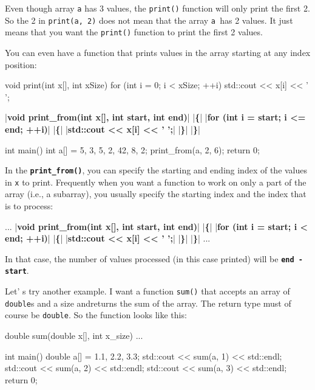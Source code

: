 Even though array \texttt{a} has 3 values, the \texttt{print()} function will only print the first 2. So the 2 in \texttt{print(a, 2)} does not mean that the array \texttt{a }has 2 values. It just means that you want the \texttt{print()} function to print the first 2 values.

You can even have a function that prints values in the array starting at any index position:

\begin{consolethree}[escapeinside=||]
void print(int x[], int xSize)
{
    for (int i = 0; i < xSize; ++i)
    {
        std::cout << x[i] << ' ';
    }
}

|\textbf{void print\_from(int x[], int start, int end)}|
|\textbf{\{}|
    |\textbf{for (int i = start; i <= end; ++i)}|
    |\textbf{\{}|
        |\textbf{std::cout << x[i] << ' ';}|
    |\textbf{\}}|
|\textbf{\}}|

int main()
{
    int a[] = {5, 3, 5, 2, 42, 8, 2};
    print_from(a, 2, 6);
    return 0;
}
\end{consolethree}

In the \texttt{\textbf{print\_from()}}, you can specify the starting and ending index of the values in \texttt{x} to print. Frequently when you want a function to work on only a part of the array (i.e., a subarray), you usually specify the starting index and the index that is  to process:

\begin{consolethree}[escapeinside=||]
...
|\textbf{void print\_from(int x[], int start, int end)}|
|\textbf{\{}|
    |\textbf{for (int i = start; i < end; ++i)}|
    |\textbf{\{}|
        |\textbf{std::cout << x[i] << ' ';}|
    |\textbf{\}}|
|\textbf{\}}|
...
\end{consolethree}

In that case, the number of values processed (in this case printed) will be \texttt{\textbf{end - start}}.

Let' s try another example. I want a function \texttt{sum()} that accepts an array of \texttt{double}s and a size andreturns the sum of the array. The return type must of course be \texttt{double}. So the function looks like this:

\begin{consolethree}[escapeinside=||]
double sum(double x[], int x_size)
{
    ...
}

int main()
{
    double a[] = {1.1, 2.2, 3.3};
    std::cout << sum(a, 1) << std::endl;
    std::cout << sum(a, 2) << std::endl;
    std::cout << sum(a, 3) << std::endl;
    return 0;
}
\end{consolethree}

